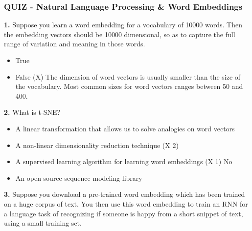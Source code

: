 \subsubsection{QUIZ - Natural Language Processing \& Word Embeddings}
\textbf{1.} Suppose you learn a word embedding for a vocabulary of 10000 words. Then the embedding vectors should be 10000 dimensional, so as to capture the full range of variation and meaning in those words.
\begin{itemize}
    \item True
    \item False (X) The dimension of word vectors is usually smaller than the size of the vocabulary. Most common sizes for word vectors ranges between 50 and 400.
\end{itemize}
\textbf{2.} What is t-SNE?
\begin{itemize}
    \item A linear transformation that allows us to solve analogies on word vectors
    \item A non-linear dimensionality reduction technique (X 2)
    \item A supervised learning algorithm for learning word embeddings (X 1) No
    \item An open-source sequence modeling library
\end{itemize}
\textbf{3.} Suppose you download a pre-trained word embedding which has been trained on a huge corpus of text. You then use this word embedding to train an RNN for a language task of recognizing if someone is happy from a short snippet of text, using a small training set.

